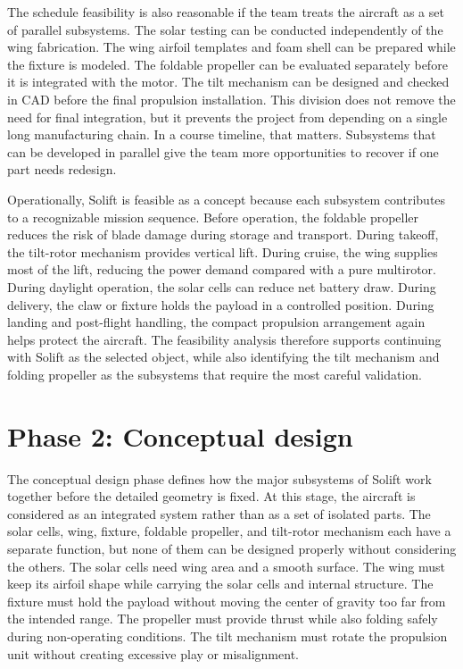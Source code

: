 The schedule feasibility is also reasonable if the team treats the aircraft as a set of parallel subsystems. The solar testing can be conducted independently of the wing fabrication. The wing airfoil templates and foam shell can be prepared while the fixture is modeled. The foldable propeller can be evaluated separately before it is integrated with the motor. The tilt mechanism can be designed and checked in CAD before the final propulsion installation. This division does not remove the need for final integration, but it prevents the project from depending on a single long manufacturing chain. In a course timeline, that matters. Subsystems that can be developed in parallel give the team more opportunities to recover if one part needs redesign.

Operationally, Solift is feasible as a concept because each subsystem contributes to a recognizable mission sequence. Before operation, the foldable propeller reduces the risk of blade damage during storage and transport. During takeoff, the tilt-rotor mechanism provides vertical lift. During cruise, the wing supplies most of the lift, reducing the power demand compared with a pure multirotor. During daylight operation, the solar cells can reduce net battery draw. During delivery, the claw or fixture holds the payload in a controlled position. During landing and post-flight handling, the compact propulsion arrangement again helps protect the aircraft. The feasibility analysis therefore supports continuing with Solift as the selected object, while also identifying the tilt mechanism and folding propeller as the subsystems that require the most careful validation.

\section{Phase 2: Conceptual design}
\label{subsec:phase2-conceptual}

The conceptual design phase defines how the major subsystems of Solift work together before the detailed geometry is fixed. At this stage, the aircraft is considered as an integrated system rather than as a set of isolated parts. The solar cells, wing, fixture, foldable propeller, and tilt-rotor mechanism each have a separate function, but none of them can be designed properly without considering the others. The solar cells need wing area and a smooth surface. The wing must keep its airfoil shape while carrying the solar cells and internal structure. The fixture must hold the payload without moving the center of gravity too far from the intended range. The propeller must provide thrust while also folding safely during non-operating conditions. The tilt mechanism must rotate the propulsion unit without creating excessive play or misalignment.

